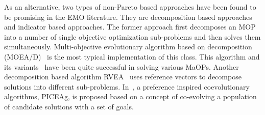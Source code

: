 \documentclass[review]{elsarticle}
\begin{document}
As an alternative, two types of non-Pareto based approaches have been found to be promising in the EMO literature. They are decomposition based approaches and indicator based approaches. The former approach first decomposes an MOP into a number of single objective optimization sub-problems and then solves them simultaneously. Multi-objective evolutionary algorithm based on decomposition (MOEA/D)~\citep{zhang2007moea} is the most typical implementation of this class. 
This algorithm and its variants~\citep{li2009multiobjective,zhang2009performance,moeadsas} have been quite successful in solving various MaOPs.
Another decomposition based algorithm RVEA~\citep{referencevectorguided} uses reference vectors to decompose solutions into different sub-problems. 
In~\citep{piceag}, a preference inspired coevolutionary algorithms, PICEAg, is proposed based on a concept of co-evolving a population of candidate solutions with a set of goals.

%
\end{document}
